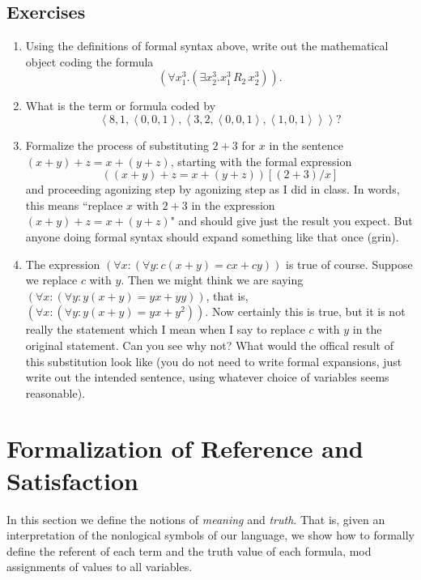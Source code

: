 \documentclass[12pt]{book}
\begin{document}
\subsection{Exercises}

\begin{enumerate}

\item Using the definitions of formal syntax above, write out the
mathematical object coding the formula $$(\forall x^3_1.(\exists
x^3_2.x^3_1\, R_2\, x^3_2)).$$

\item What is the term or formula coded by 
$$\left<8,1,\left<0,0,1\right>,\left<3,2,\left<0,0,1\right>,\left<1,0,1\right>\right>\right>?$$

\item  Formalize the process of substituting $2+3$ for $x$ in the sentence $(x+y)+z = x+(y+z)$, starting with the formal expression $$((x+y)+z = x+(y+z))[(2+3)/x]$$ and proceeding agonizing step by agonizing step as I did in class.  In words, this means ``replace $x$ with $2+3$ in the expression $(x+y)+z = x+(y+z)$" and should give just the result you expect.  But anyone doing formal syntax should expand something like that once (grin).

\item  The expression $(\forall x:  (\forall y:  c(x+y) = cx + cy))$  is true of course.  Suppose we replace $c$ with $y$.  Then we might think we are saying $(\forall x:  (\forall y:  y(x+y) = yx + yy))$, that is, $(\forall x:(\forall y: y(x+y)  = yx+y^2))$.  Now certainly this is true, but it is not really the statement which I mean when I say to replace $c$ with $y$ in the original statement.  Can you see why not?  What would the offical result of this substitution look like (you do not need to write formal expansions, just write out the intended
sentence, using whatever choice of variables seems reasonable).

\end{enumerate}

\newpage

\section{Formalization of Reference and Satisfaction}

In this section we define the notions of {\em meaning\/} and {\em
truth\/}.  That is, given an interpretation of the nonlogical symbols
of our language, we show how to formally define the referent of each
term and the truth value of each formula, mod assignments of values
to all variables.
\end{document}
